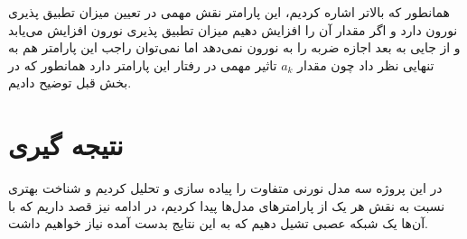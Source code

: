 \documentclass[12pt]{extreport}
\theoremstyle{definition}
\begin{document}
\begin{itemize}
همانطور که بالاتر اشاره کردیم، این پارامتر نقش مهمی در تعیین میزان تطبیق پذیری نورون دارد و اگر مقدار آن را افزایش دهیم میزان تطبیق پذیری نورون افزایش می‌یابد و از جایی به بعد اجازه ضربه را به نورون نمی‌دهد اما نمی‌توان راجب این پارامتر هم به تنهایی نظر داد چون مقدار $a_k$ تاثیر مهمی در رفتار این پارامتر دارد همانطور که در بخش قبل توضیح دادیم.



\section*{نتیجه گیری}

در این پروژه سه مدل نورنی متفاوت را پیاده سازی و تحلیل کردیم و شناخت بهتری نسبت به نقش هر یک از پارامترهای مدل‌ها پیدا کردیم، در ادامه نیز قصد داریم که با آن‌ها یک شبکه عصبی تشیل دهیم که به این نتایج بدست آمده نیاز خواهیم داشت.




\end{itemize}
\end{document}
